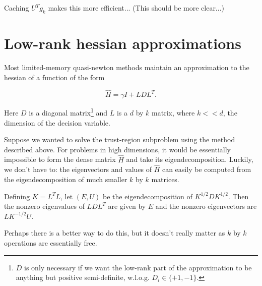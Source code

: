 \documentclass[10pt]{article}
\begin{document}
Caching $U^Tg_k$ makes this more efficient...
(This should be more clear...)
\section{Low-rank hessian approximations}
Most limited-memory quasi-newton methods maintain an approximation to the hessian of a function of the form 

$$ \hat{H} = \gamma I + LDL^{T}.$$

Here $D$ is a diagonal matrix\footnote{$D$ is only necessary if we want the low-rank part of the approximation to be anything but positive semi-definite, w.l.o.g. $D_i \in \{+1,-1\}$.} and $L$ is a $d$ by $k$ matrix, where $k << d$, the dimension of the decision variable.

Suppose we wanted to solve the trust-region subproblem using the method described above. For problems in high dimensions, it would be essentially impossible to form the dense matrix $\hat{H}$ and take its eigendecomposition. Luckily, we don't have to: the eigenvectors and values of $\hat{H}$ can easily be computed from the eigendecomposition of much smaller $k$ by $k$ matrices. 

Defining $K = L^TL$, let $(E,U)$ be the eigendecomposition of $K^{1/2}DK^{1/2}$. Then the nonzero eigenvalues of $LDL^T$ are given by $E$ and the nonzero eigenvectors are $LK^{-1/2}U$.

Perhaps there is a better way to do this, but it doesn't really matter as $k$ by $k$ operations are essentially free.
\end{document}
